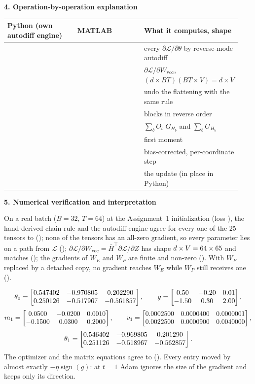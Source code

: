 \documentclass[11pt,a4paper]{article}
\makeatletter
\numberwithin{equation}{section}
\newcommand{\T}{^{\top}}
\newcommand{\Wvoc}{W_{\mathrm{voc}}}
\newcommand{\Hbar}{\bar H}
\DeclareRobustCommand{\code}[1]{\texttt{\detokenize{#1}}}
\newenvironment{ops}{\par\small\renewcommand{\arraystretch}{1.18}%
  \begin{longtable}{@{}>{\raggedright\arraybackslash}p{0.325\linewidth}>{\raggedright\arraybackslash}p{0.30\linewidth}>{\raggedright\arraybackslash}p{0.315\linewidth}@{}}
  \toprule \textbf{Python (own autodiff engine)} & \textbf{MATLAB} & \textbf{What it computes, shape}\\ \midrule\endhead}
  {\bottomrule\end{longtable}\vspace{-0.6em}}
\newcommand{\stephead}[1]{\par\smallskip\noindent\textbf{\small #1}\par\nobreak}
\makeatother
\begin{document}
\stephead{4. Operation-by-operation explanation}
\begin{ops}
\code{L_t.backward()} & \code{dlfeval(@dl_gpt_loss, ...)} & every $\partial\mathcal L/\partial\theta$ by reverse-mode autodiff\\
\code{Hbar.T @ G_Z} & \code{c.Hbar' * G_Z} & $\partial\mathcal L/\partial\Wvoc$, $(d\times BT)(BT\times V)=d\times V$\\
\code{(G_Z @ W_voc.T).reshape(B, T, d)} & \code{reshape(G_Z * P.W_voc', c.B, c.T, d)} & undo the flattening with the same rule\\
\code{for l in range(L, 0, -1)} & \code{for l = nb:-1:1} & blocks in reverse order\\
\code{A1.embedding_backward(G_H, O, T_max)} & \code{embed_backward(G_H, c.O, ...)} & $\sum_bO_b\T G_{H_b}$ and $\sum_bG_{H_b}$\\
\code{self.m[k] = b1 * self.m[k] + (1 - b1) * g} & \code{state.m.(n) = beta1 * state.m.(n) + ...} & first moment\\
\code{m_hat / (np.sqrt(v_hat) + self.eps)} & \code{(m / c1) ./ (sqrt(v / c2) + eps_a)} & bias-corrected, per-coordinate step\\
\code{theta += delta} & \code{F.(n) = F.(n) + step} & the update (in place in Python)\\
\end{ops}

\stephead{5. Numerical verification and interpretation}
On a real batch ($B=32$, $T=64$) at the Assignment~1 initialization (loss \FullLoss), the hand-derived chain rule and the
autodiff engine agree for every one of the 25 tensors to \FullErr{} (\code{Q3.2}); none of the tensors has an all-zero
gradient, so every parameter lies on a path from $\mathcal L$ (\code{Q3.3}); $\partial\mathcal L/\partial\Wvoc=\Hbar\T\partial\mathcal L/\partial Z$
has shape $d\times V=64\times65$ and matches (\code{Q3.4}); the gradients of $W_E$ and $W_P$ are finite and non-zero
(\code{Q3.5}). With $W_E$ replaced by a detached copy, no gradient reaches $W_E$ while $W_P$ still receives one (\code{Q3.6}).

\begin{result}
\[
\theta_0=\begin{bmatrix}0.547402 & -0.970805 & 0.202290 \\ 0.250126 & -0.517967 & -0.561857\end{bmatrix},\qquad g=\begin{bmatrix}0.50 & -0.20 & 0.01 \\ -1.50 & 0.30 & 2.00\end{bmatrix},
\]
\[
m_1=\begin{bmatrix}0.0500 & -0.0200 & 0.0010 \\ -0.1500 & 0.0300 & 0.2000\end{bmatrix},\qquad v_1=\begin{bmatrix}0.0002500 & 0.0000400 & 0.0000001 \\ 0.0022500 & 0.0000900 & 0.0040000\end{bmatrix},
\]
\[
\theta_1=\begin{bmatrix}0.546402 & -0.969805 & 0.201290 \\ 0.251126 & -0.518967 & -0.562857\end{bmatrix} .
\]
The optimizer and the matrix equations agree to \BthreeErr{} (\code{B3.1}). Every entry moved by almost exactly
$-\eta\operatorname{sign}(g)$: at $t=1$ Adam ignores the size of the gradient and keeps only its direction.
\end{result}
\end{document}
